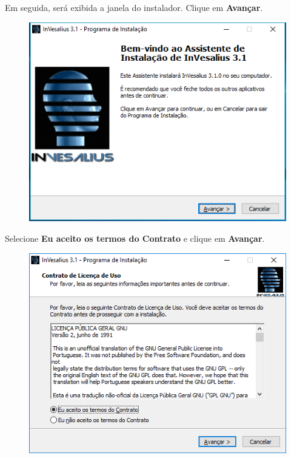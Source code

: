 \hspace{.2cm}

Em seguida, será exibida a janela do instalador. Clique em \textbf{Avançar}.

\begin{figure}[!htb]
\centering
\includegraphics[scale=0.7]{../user_guide_figures/invesalius_screen/installation_welcome_pt.png}
\end{figure}

\newpage

Selecione \textbf{Eu aceito os termos do Contrato} e clique em \textbf{Avançar}.

\begin{figure}[!htb] 
\centering
\includegraphics[scale=0.7]{../user_guide_figures/invesalius_screen/installation_license_pt.png}
\end{figure}


